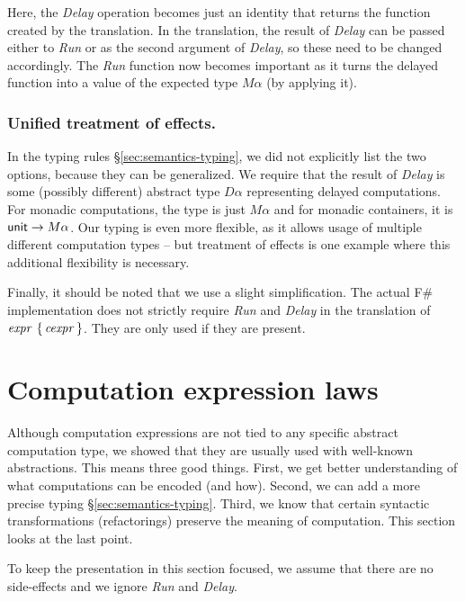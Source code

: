 \documentclass[runningheads,a4paper]{llncs}
\begin{document}
%
Here, the \emph{Delay} operation becomes just an identity that returns the function created by the
translation. In the translation, the result of \emph{Delay} can be passed either to \emph{Run}
or as the second argument of \emph{Delay}, so these need to be changed accordingly. The \emph{Run}
function now becomes important as it turns the delayed function into a value of the expected
type $M\alpha$ (by applying it).

\vspace{-1em}
\subsubsection{Unified treatment of effects.} In the typing rules \S\ref{sec:semantics-typing}, 
we did not explicitly list the two options, because they can be generalized. We require that the
result of \emph{Delay} is some (possibly different) abstract type $D\alpha$ representing delayed
computations. For monadic computations, the type is just $M\alpha$ and for monadic containers,
it is $\textnormal{\sffamily unit} \rightarrow M\alpha$. Our typing is even more flexible, as it allows usage of 
multiple different computation types -- but treatment of effects is one example where this
additional flexibility is necessary.

Finally, it should be noted that we use a slight simplification. The actual F\# implementation 
does not strictly require \emph{Run} and \emph{Delay} in the translation of $\textnormal{\emph{expr}}~\{\,\textnormal{\emph{cexpr}}\,\}$. 
They are only used if they are present. 



\section{Computation expression laws}
\label{sec:laws}

Although computation expressions are not tied to any specific abstract computation type, we 
showed that they are usually used with well-known abstractions.
This means three good things. First, we get better understanding of what computations can be encoded
(and how). Second, we can add a more precise typing \S\ref{sec:semantics-typing}. Third, we know
that certain syntactic transformations (refactorings) preserve the meaning of computation. This
section looks at the last point. 

To keep the presentation in this section focused, we assume that there are no side-effects 
and we ignore \emph{Run} and \emph{Delay}.
\end{document}
